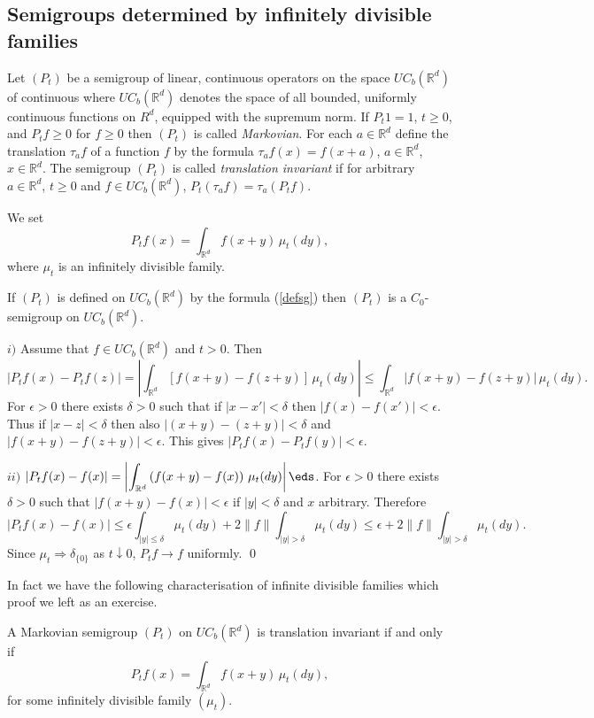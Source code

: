 \documentclass[preprint]{imsart}
\def\R{\mathbb R}
\def\ds{\displaystyle}
\begin{document}
{\subsection{Semigroups determined by infinitely divisible families}

\noindent Let $(P_t)$ be a semigroup  of linear, continuous  operators on the space
$UC_b (\R^d)$ of continuous where $UC_b (\R^d)$ denotes the space of all bounded, uniformly
continuous functions on $R^{d}$, equipped with the supremum norm.
If $P_t1=1$, $t\geq 0$, and $P_tf\geq 0$
for $f\geq 0$ then $(P_t)$ is called {\it Markovian}. For
each $a\in\R^d$ define the translation $\tau_af$ of a
function $f$ by the formula $\tau_af(x)=f(x+a)$,
$a\in\R^d$, $x\in\R^d$. The semigroup $(P_t)$ is called
{\it translation invariant} if for arbitrary $a\in\R^d$,
$t\geq 0$ and $f\in UC_b (\R^d)$,
$P_t(\tau_af)=\tau_a(P_tf)$.

\noindent We set
\begin{equation}\label{defsg}
P_tf(x)=\int_{\R^d}f(x+y)\, \mu_t(dy),
\end{equation}
where $\mu_t$ is an infinitely divisible family.


\begin{Proposition}\label{semigroup}
If $(P_t)$ is defined on $UC_b(\R^d)$ by the formula
(\ref{defsg}) then $(P_t)$ is a $C_0$-semigroup on
$UC_b(\R^d)$.
\end{Proposition}
$i)$ Assume that $f\in UC_b(\R^d)$ and $t>0$. Then
$$
|P_tf(x) -P_tf(z)| = \left| \int_{\R^d} [f(x+y)
-f(z+y)]\,\mu_t(dy)\right| \leq
 \int_{\R^d} \left| f(x+y)
-f(z+y)\right| \,\mu_t(dy).
$$
For $\epsilon >0$ there exists $\delta >0$ such that if
$|x-x'|<\delta$ then $|f(x)-f(x')|<\epsilon$. Thus if
$|x-z|<\delta$ then also $|(x+y)-(z+y)|<\delta$ and
$|f(x+y)-f(z+y)|<\epsilon$. This gives
$|P_tf(x)-P_tf(y)|<\epsilon$.

$ii)$ $\ds |P_tf(x)-f(x)| =\left| \int_{\R^d}\left(
f(x+y)-f(x)\right)\, \mu_t(dy)\right|\eds$. For
$\epsilon
>0$ there exists $\delta >0$ such that
$|f(x+y)-f(x)|<\epsilon$ if $|y|<\delta$ and $x$
arbitrary. Therefore
$$
|P_tf(x)-f(x)| \leq \epsilon \int_{|y|\leq \delta}
\mu_t(dy) +2 \| f\|\int_{|y|> \delta}\mu_t(dy)
\leq \epsilon +2\| f\|\int_{|y|> \delta}\mu_t(dy).
$$
Since $\mu_t\Rightarrow \delta_{\{ 0\}}$ as
$t\downarrow 0$, $P_tf\to f$ uniformly. \qed

\noindent In fact we have the following characterisation of infinite divisible families which proof we
left as an exercise.
\begin{Proposition}
A Markovian semigroup
$(P_t)$ on $UC_b (\R^d)$ is translation invariant if and only if
$$
P_tf(x)=\int_{\R^d}f(x+y)\, \mu_t(dy),
$$
for some  infinitely divisible family $(\mu_t)$.
\end{Proposition}







}
\end{document}
